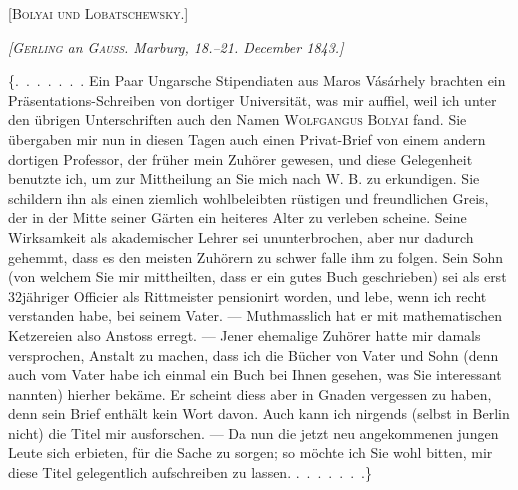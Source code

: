 \clearpage
{}%
\begin{center}
{\Large\textsc{[Bolyai und Lobatschewsky.]}}



\emph{[\textup{\textsc{Gerling}} an \textup{\textsc{Gauss}}. Marburg, 18.--21. December 1843.]}
\end{center}


\{\mbox{.\ .\ .\ .\ .\ .\ .} Ein Paar Ungarsche Stipendiaten aus Maros Vásárhely brachten ein
Präsentations-Schreiben von dortiger Universität, was mir auffiel, weil ich unter
den übrigen Unterschriften auch den Namen \textsc{Wolfgangus Bolyai} fand. Sie
übergaben mir nun in diesen Tagen auch einen Privat-Brief von einem andern dortigen
Professor, der früher mein Zuhörer gewesen, und diese Gelegenheit benutzte ich, um
zur Mittheilung an Sie mich nach W. B. zu erkundigen. Sie schildern ihn als einen
ziemlich wohlbeleibten rüstigen und freundlichen Greis, der in der Mitte seiner
Gärten ein heiteres Alter zu verleben scheine. Seine Wirksamkeit als akademischer
Lehrer sei ununterbrochen, aber nur dadurch gehemmt, dass es den meisten Zuhörern zu
schwer falle ihm zu folgen. Sein Sohn (von welchem Sie mir mittheilten, dass er ein
gutes Buch geschrieben) sei als erst 32jähriger Officier als Rittmeister pensionirt
worden, und lebe, wenn ich recht verstanden habe, bei seinem Vater. --- Muthmasslich
hat er mit mathematischen Ketzereien also Anstoss erregt. --- Jener ehemalige
Zuhörer hatte mir damals versprochen, Anstalt zu machen, dass ich die Bücher von
Vater und Sohn (denn auch vom Vater habe ich einmal ein Buch bei Ihnen gesehen, was
Sie interessant nannten) hierher bekäme. Er scheint diess aber in Gnaden vergessen
zu haben, denn sein Brief enthält kein Wort davon. Auch kann ich nirgends (selbst in
Berlin nicht) die Titel mir ausforschen. --- Da nun die jetzt neu angekommenen
jungen Leute sich erbieten, für die Sache zu sorgen; so möchte ich Sie wohl bitten,
mir diese Titel gelegentlich aufschreiben zu lassen. \mbox{.\ .\ .\ .\ .\ .\ .}\}


